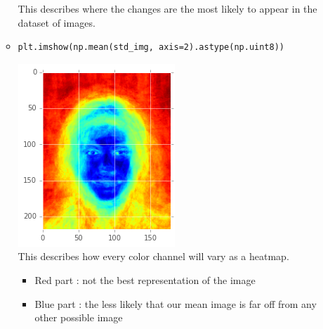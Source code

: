 \documentclass[12pt,a4paper]{article}
\begin{document}
\begin{itemize}
\begin{itemize}
This describes where the changes are the most likely to appear in the dataset of images.
\item \begin{lstlisting}
plt.imshow(np.mean(std_img, axis=2).astype(np.uint8))
\end{lstlisting}
\includegraphics[scale=0.5]{dataStdMean}\\
This describes how every color channel will vary as a heatmap.
\begin{itemize}
\item Red part : not the best representation of the image
\item Blue part : the less likely that our mean image is far off from any other possible image
\end{itemize}
\end{itemize}
\end{itemize}
\end{document}
